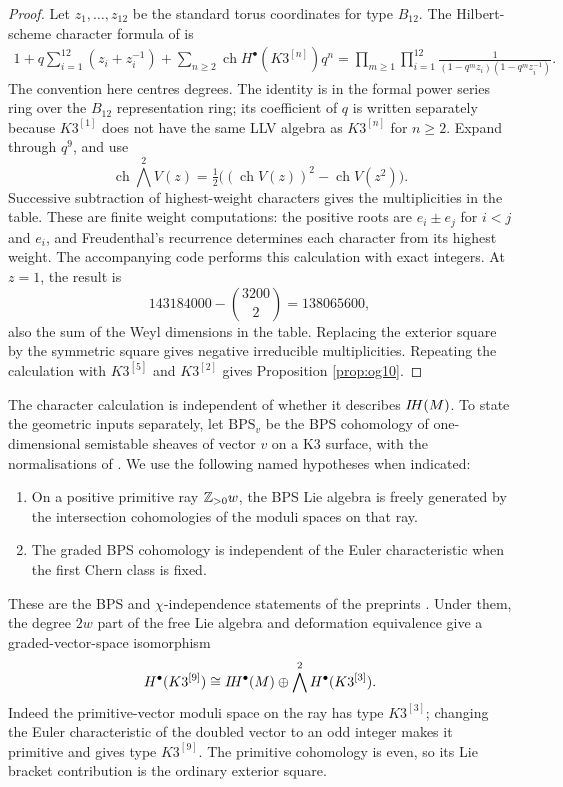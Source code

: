 \begin{proof}
Let $z_1,\ldots,z_{12}$ be the standard torus coordinates
for type $B_{12}$. The Hilbert-scheme character formula
of \cite[Theorem~1.2(1)]{gklr22} is
\begin{equation}\label{eq:Hilbert-character}
 \begin{split}
 1+q\sum_{i=1}^{12}(z_i+z_i^{-1})
 +\sum_{n\ge2}\operatorname{ch}H^\bullet(K3^{[n]})q^n
 =\prod_{m\ge1}\prod_{i=1}^{12}
 \frac{1}{(1-q^mz_i)(1-q^mz_i^{-1})}.
 \end{split}
\end{equation}
The convention here centres degrees. The identity is in the
formal power series ring over the $B_{12}$ representation ring;
its coefficient of $q$ is written separately because $K3^{[1]}$
does not have the same LLV algebra as $K3^{[n]}$ for $n\ge2$.
Expand through $q^9$, and use
\[
 \operatorname{ch}\bigwedge^2 V(z)
 =\tfrac12\big((\operatorname{ch}V(z))^2-
                    \operatorname{ch}V(z^2)\big).
\]
Successive subtraction of highest-weight characters gives the
multiplicities in the table. These are finite weight computations:
the positive roots are $e_i\pm e_j$ for $i<j$ and $e_i$,
and Freudenthal's recurrence determines each character from
its highest weight. The accompanying code performs this
calculation with exact integers. At $z=1$, the result is
\[
 143184000-\binom{3200}{2}=138065600,
\]
also the sum of the Weyl dimensions in the table. Replacing
the exterior square by the symmetric square gives negative
irreducible multiplicities. Repeating the calculation with
$K3^{[5]}$ and $K3^{[2]}$ gives Proposition \ref{prop:og10}.
\end{proof}

The character calculation is independent of whether it describes
$I\!H(M)$. To state the geometric inputs separately, let
$\mathrm{BPS}_v$ be the BPS cohomology of one-dimensional
semistable sheaves of vector $v$ on a K3 surface, with the
normalisations of \cite{dhsm22}. We use the following named
hypotheses when indicated:
\begin{enumerate}
\item[(H1)] On a positive primitive ray $\mathbb Z_{>0}w$, the BPS
Lie algebra is freely generated by the intersection cohomologies
of the moduli spaces on that ray.
\item[(H2)] The graded BPS cohomology is independent of the
Euler characteristic when the first Chern class is fixed.
\end{enumerate}
These are the BPS and $\chi$-independence statements of the
preprints \cite{dhsm22,dhksv26,gwz26}. Under them, the degree
$2w$ part of the free Lie algebra and deformation equivalence
\cite[Theorem~1.7]{pr23} give a graded-vector-space isomorphism
\begin{equation}\label{eq:graded-comparison}
 H^\bullet(K3^{[9]})\cong I\!H^\bullet(M)
                \oplus\bigwedge^2H^\bullet(K3^{[3]}).
\end{equation}
Indeed the primitive-vector moduli space on the ray has type
$K3^{[3]}$; changing the Euler characteristic of the doubled
vector to an odd integer makes it primitive and gives type
$K3^{[9]}$. The primitive cohomology is even, so its Lie bracket
contribution is the ordinary exterior square.

